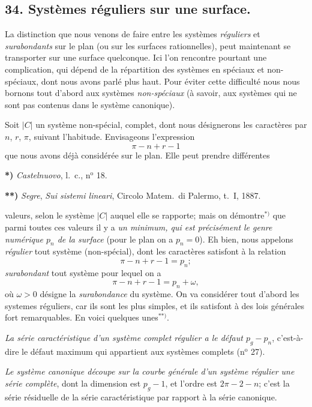 \documentclass{article}
\begin{document}
\subsection*{34. Systèmes réguliers sur une surface.}

La distinction que nous venons de faire entre les systèmes \emph{réguliers} et \emph{surabondants} sur le plan (ou sur les surfaces rationnelles), peut maintenant se transporter sur une surface quelconque. Ici l'on rencontre pourtant une complication, qui dépend de la répartition des systèmes en spéciaux et non-spéciaux, dont nous avons parlé plus haut. Pour éviter cette difficulté nous nous bornons tout d'abord aux systèmes \emph{non-spéciaux} (à savoir, aux systèmes qui ne sont pas contenus dans le système canonique).

Soit $|C|$ un système non-spécial, complet, dont nous désignerons les caractères par $n$, $r$, $\pi$, suivant l'habitude. Envisageons l'expression
\[ \pi - n + r - 1 \]
que nous avons déjà considérée sur le plan. Elle peut prendre différentes

\textbf{*)} \emph{Castelnuovo}, l.\ c., n${}^{\text{o}}$ 18.

\textbf{**)} \emph{Segre}, \emph{Sui sistemi lineari}, Circolo Matem.\ di Palermo, t.\ I, 1887.

valeurs, selon le système $|C|$ auquel elle se rapporte; mais on démontre${}^{*)}$ que parmi toutes ces valeurs il y a \emph{un minimum, qui est précisément le genre numérique $p_{n}$ de la surface} (pour le plan on a $p_{n} = 0$). Eh bien, nous appelons \emph{régulier} tout système (non-spécial), dont les caractères satisfont à la relation
\[ \pi - n + r - 1 = p_{n}; \tag{4} \]
\emph{surabondant} tout système pour lequel on a
\[ \pi - n + r - 1 = p_{n} + \omega, \tag{5} \]
où $\omega > 0$ désigne la \emph{surabondance} du système. On va considérer tout d'abord les systemes réguliers, car ils sont les plus simples, et ils satisfont à des lois générales fort remarquables. En voici quelques unes${}^{**)}$.

\emph{La série caractéristique d'un système complet régulier a le défaut $p_{g} - p_{n}$}, c'est-à-dire le défaut maximum qui appartient aux systèmes complets (n${}^{\text{o}}$ 27).

\emph{Le système canonique découpe sur la courbe générale d'un système régulier une série complète}, dont la dimension est $p_{g} - 1$, et l'ordre est $2\pi - 2 - n$; c'est la série résiduelle de la série caractéristique par rapport à la série canonique.
\end{document}
